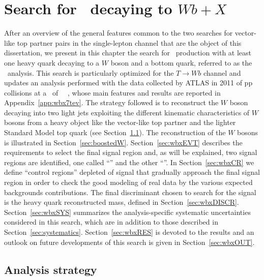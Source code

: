 \clearpage{\pagestyle{empty}\cleardoublepage}

\chapter{Search for \TTbar\ decaying to $Wb+X$}\label{chap:wbx}

After an overview of the general features
common to the two searches for vector-like top partner pairs
in the single-lepton channel that are the object of this dissertation,
we present in this chapter the search for \TTbar\ production with
at least one heavy quark decaying to a $W$ boson and a bottom
quark, referred to as the \wbx\ analysis.
This search is particularly optimized for the $T\to Wb$ channel
and updates an analysis performed with the data collected
by ATLAS in 2011 of pp collisions at a \cme\ of ~\tev~\cite{ATLAS:2012qe},
whose main features and results are reported in Appendix~\ref{app:wbx7tev}.
The strategy followed is to reconstruct the $W$ boson decaying
into two light jets exploiting the different kinematic characteristics
of $W$ bosons from a heavy object like the vector-like top partner
and the lighter Standard Model top quark (see Section~\ref{sec:wbxSTRAT}).
The reconstruction of the $W$ bosons is illustrated in
Section~\ref{sec:boostedW}.
Section~\ref{sec:wbxEVT} describes the requirements to select the
final signal region and, as will be explained, two signal regions are identified, 
one called ``\loose'' and the other ``\tight''.
In Section~\ref{sec:wbxCR} we define ``control regions'' depleted of
signal that gradually approach the final signal region in order to 
check the good modeling of real data by the various expected
backgrounds contributions. 
The final discriminant chosen to search for the signal is
the heavy quark reconstructed mass, defined in Section~\ref{sec:wbxDISCR}.
Section~\ref{sec:wbxSYS} summarizes the analysis-specific 
systematic uncertainties considered in this search, which are in addition to
those described in Section~\ref{sec:systematics}.
Section~\ref{sec:wbxRES} is devoted to the results
and an outlook on future developments of this search is given
in Section~\ref{sec:wbxOUT}.

\section{Analysis strategy}\label{sec:wbxSTRAT}

